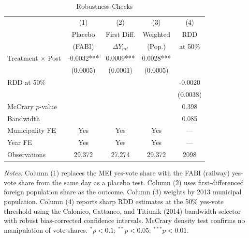 \begin{table}[htbp]
\centering
\caption{Robustness Checks}
\label{tab:robustness}
\begin{tabular}{lcccc}
\hline\hline
 & (1) & (2) & (3) & (4) \\
 & Placebo & First Diff. & Weighted & RDD \\
 & (FABI) & $\Delta Y_{mt}$ & (Pop.) & at 50\% \\
\hline
Treatment $\times$ Post & -0.0032*** & 0.0009*** & 0.0028*** & \\
 & (0.0005) & (0.0001) & (0.0005) & \\
RDD at 50\% & & & & -0.0020 \\
 & & & & (0.0038) \\
\hline
McCrary $p$-value & & & & 0.398 \\
Bandwidth & & & & 0.085 \\
Municipality FE & Yes & Yes & Yes & --- \\
Year FE & Yes & Yes & Yes & --- \\
Observations & 29,372 & 27,274 & 29,372 & 2098 \\
\hline\hline
\end{tabular}
\begin{tablenotes}[flushleft]\footnotesize
\item \textit{Notes:} Column (1) replaces the MEI yes-vote share with the FABI (railway) yes-vote share from the same day as a placebo test. Column (2) uses first-differenced foreign population share as the outcome. Column (3) weights by 2013 municipal population. Column (4) reports sharp RDD estimates at the 50\% yes-vote threshold using the Calonico, Cattaneo, and Titiunik (2014) bandwidth selector with robust bias-corrected confidence intervals. McCrary density test confirms no manipulation of vote shares. $^{*}p<0.1$; $^{**}p<0.05$; $^{***}p<0.01$.
\end{tablenotes}
\end{table}

